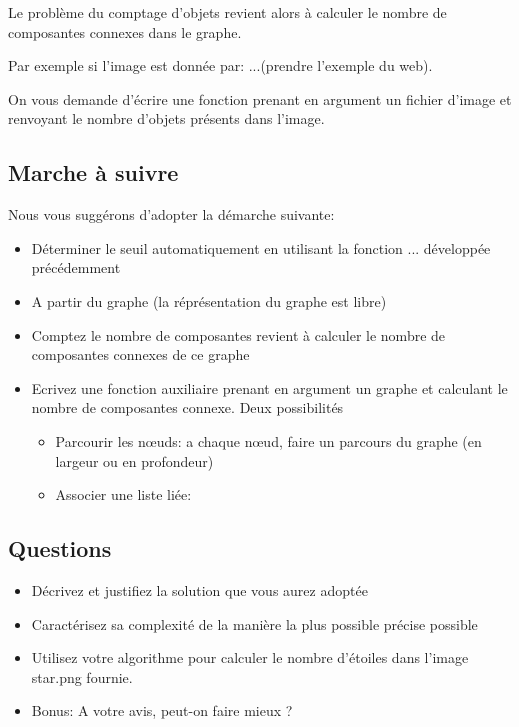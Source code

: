 \documentclass[a4paper,10pt]{article}
\begin{document}
Le problème du comptage d'objets revient alors à calculer le nombre de
composantes connexes dans le graphe.

Par exemple si l'image est donnée par: ...(prendre l'exemple du web).

On vous demande d'écrire une fonction prenant en argument un fichier d'image et renvoyant le nombre d'objets présents dans l'image.

\subsection*{Marche à suivre}

Nous vous suggérons d'adopter la démarche suivante:
\begin{itemize}
\item Déterminer le seuil automatiquement en utilisant la fonction ... développée précédemment
\item A partir du graphe (la réprésentation du graphe est libre)
\item Comptez le nombre de composantes revient à calculer le nombre de composantes connexes de ce graphe
\item Ecrivez une fonction auxiliaire prenant en argument un graphe et calculant le nombre de composantes connexe. Deux possibilités
\begin{itemize}
\item Parcourir les n\oe uds: a chaque n\oe ud, faire un parcours du graphe (en largeur ou en profondeur) 
\item Associer une liste liée:
\end{itemize}
\end{itemize}

\subsection*{Questions}

\begin{itemize}
\item Décrivez et justifiez la solution que vous aurez adoptée
\item Caractérisez sa complexité de la manière la plus possible précise possible
\item Utilisez votre algorithme pour calculer le nombre d'étoiles dans
  l'image star.png fournie.
\item Bonus: A votre avis, peut-on faire mieux ?
\end{itemize}
\end{document}
